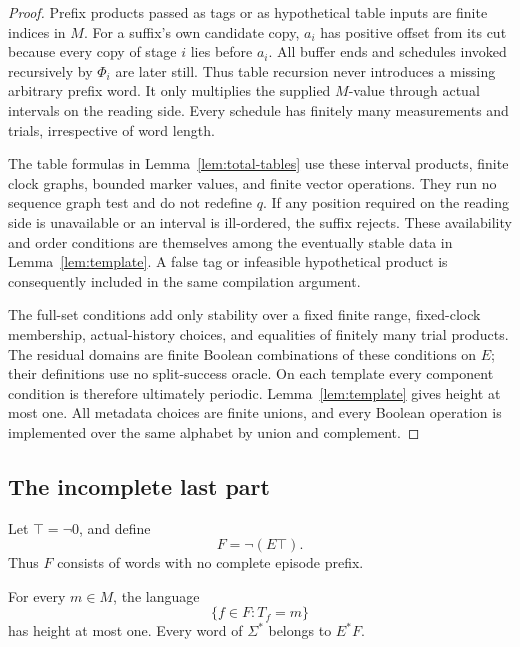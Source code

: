 \begin{proof}
Prefix products passed as tags or as hypothetical table inputs are finite
indices in \(M\). For a suffix's own candidate copy, \(a_i\) has positive
offset from its cut because every copy of stage \(i\) lies before \(a_i\).
All buffer ends and schedules invoked recursively by \(\Phi_i\) are later
still. Thus table recursion never introduces a missing arbitrary prefix word.
It only multiplies the supplied \(M\)-value through actual intervals on the
reading side. Every schedule has finitely many measurements and trials,
irrespective of word length.

The table formulas in Lemma~\ref{lem:total-tables} use these interval products,
finite clock graphs, bounded marker values, and finite vector operations.
They run no sequence graph test and do not redefine \(q\).
If any position required on the reading side is unavailable or an interval
is ill-ordered, the suffix rejects. These availability and order conditions
are themselves among the eventually stable data in Lemma~\ref{lem:template}.
A false tag or infeasible hypothetical product is consequently included in the
same compilation argument.

The full-set conditions add only stability over a fixed finite range,
fixed-clock membership, actual-history choices, and equalities of finitely
many trial products. The residual domains are finite Boolean combinations of
these conditions on \(E\); their definitions use no split-success oracle.
On each template every component condition is therefore ultimately periodic.
Lemma~\ref{lem:template} gives height at most one.
All metadata choices are finite unions, and every Boolean operation is
implemented over the same alphabet by union and complement.
\end{proof}

\subsection{The incomplete last part}

Let \(\top=\neg0\), and define
\begin{equation}\label{eq:final-F}
                         F=\neg(E\top).
\end{equation}
Thus \(F\) consists of words with no complete episode prefix.

\begin{lemma}\label{lem:final-suffix}
For every \(m\in M\), the language
\[
                             \{f\in F:T_f=m\}
\]
has height at most one. Every word of \(\Sigma^*\) belongs to \(E^*F\).
\end{lemma}

